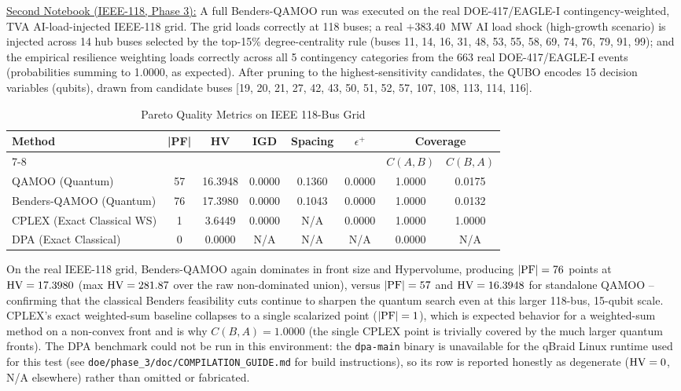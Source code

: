 \documentclass[11pt]{article}
\begin{document}
\underline{Second Notebook (IEEE-118, Phase 3):} A full Benders-QAMOO run was executed on the real DOE-417/EAGLE-I
contingency-weighted, TVA AI-load-injected IEEE-118 grid. The grid loads correctly at 118 buses; a real
$+383.40$~MW AI load shock (high-growth scenario) is injected across 14 hub buses selected by the top-15\%
degree-centrality rule (buses 11, 14, 16, 31, 48, 53, 55, 58, 69, 74, 76, 79, 91, 99); and the empirical resilience
weighting loads correctly across all 5 contingency categories from the 663 real DOE-417/EAGLE-I events (probabilities
summing to 1.0000, as expected). After pruning to the highest-sensitivity candidates, the QUBO encodes 15 decision
variables (qubits), drawn from candidate buses [19, 20, 21, 27, 42, 43, 50, 51, 52, 57, 107, 108, 113, 114, 116].

\begin{table}[h!]
\centering
\caption{Pareto Quality Metrics on IEEE 118-Bus Grid}
\label{tab:pareto-ieee118}
\vspace{0.5em}
\begin{tabular}{lccccccc}
\toprule
\textbf{Method} & |\textbf{PF}| & \textbf{HV} & \textbf{IGD} & \textbf{Spacing} & $\epsilon^+$ & \multicolumn{2}{c}{\textbf{Coverage}} \\
\cmidrule(lr){7-8}
& & & & & & $C(A,B)$ & $C(B,A)$ \\
\midrule
QAMOO (Quantum)            & 57 & 16.3948 & 0.0000 & 0.1360 & 0.0000 & 1.0000 & 0.0175 \\
Benders-QAMOO (Quantum)    & 76 & 17.3980 & 0.0000 & 0.1043 & 0.0000 & 1.0000 & 0.0132 \\
CPLEX (Exact Classical WS) & 1  & 3.6449  & 0.0000 & N/A    & 0.0000 & 1.0000 & 1.0000 \\
DPA (Exact Classical)      & 0  & 0.0000  & N/A    & N/A    & N/A    & 0.0000 & N/A    \\
\bottomrule
\end{tabular}
\end{table}

On the real IEEE-118 grid, Benders-QAMOO again dominates in front size and Hypervolume, producing $|{\rm PF}| = 76$
points at ${\rm HV} = 17.3980$ (max ${\rm HV} = 281.87$ over the raw non-dominated union), versus $|{\rm PF}| = 57$ and
${\rm HV} = 16.3948$ for standalone QAMOO -- confirming that the classical Benders feasibility cuts continue to sharpen
the quantum search even at this larger 118-bus, 15-qubit scale. CPLEX's exact weighted-sum baseline collapses to a
single scalarized point ($|{\rm PF}| = 1$), which is expected behavior for a weighted-sum method on a non-convex
front and is why $C(B,A) = 1.0000$ (the single CPLEX point is trivially covered by the much larger quantum fronts).
The DPA benchmark could not be run in this environment: the \texttt{dpa-main} binary is unavailable for the qBraid
Linux runtime used for this test (see \texttt{doe/phase\_3/doc/COMPILATION\_GUIDE.md} for build instructions), so its
row is reported honestly as degenerate (${\rm HV}=0$, N/A elsewhere) rather than omitted or fabricated.
\end{document}
